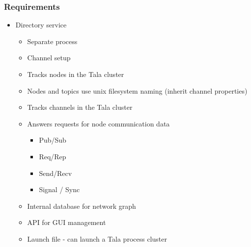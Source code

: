 \documentclass[xcolor=svgnames]{beamer}
\begin{document}
\begin{frame}[fragile]
  \frametitle{Requirements}

\begin{itemize}
\item Directory service 
\begin{itemize}
\item  Separate process
\item  Channel setup
\item  Tracks nodes in the Tala cluster
\item  Nodes and topics use unix filesystem naming (inherit channel properties)
\item  Tracks channels in the Tala cluster
\item  Answers requests for node communication data
\begin{itemize}
\item Pub/Sub
\item Req/Rep
\item Send/Recv
\item Signal / Sync
\end{itemize}
\item  Internal database for network graph
\item  API for GUI management
\item  Launch file - can launch a Tala process cluster
\end{itemize}


\end{itemize}
\end{frame}
\end{document}
